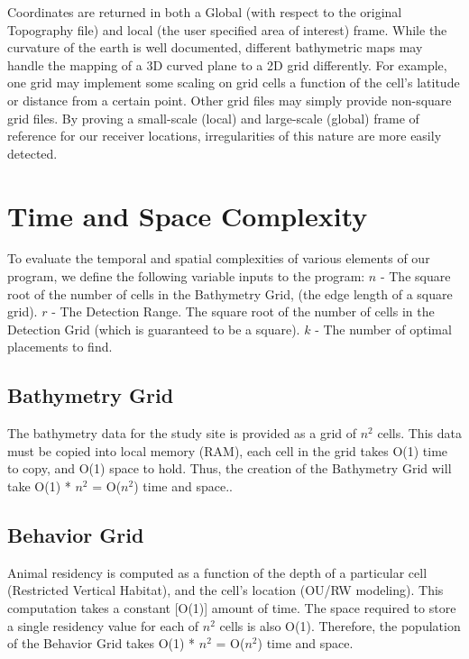 Coordinates are returned in both a Global (with respect to the original Topography file) and local (the user specified area of interest) frame.  While the curvature of the earth is well documented, different bathymetric maps may handle the mapping of a 3D curved plane to a 2D grid differently.  For example, one grid may implement some scaling on grid cells a function of the cell's latitude or distance from a certain point.  Other grid files may simply provide non-square grid files.  By proving a small-scale (local) and large-scale (global) frame of reference for our receiver locations, irregularities of this nature are more easily detected.


\section{Time and Space Complexity}
\label{computationalComplexity}
To evaluate the temporal and spatial complexities of various elements of our program, we define the following variable inputs to the program:\newline
$n$ - The square root of the number of cells in the Bathymetry Grid, (the edge length of a square grid).\newline
$r$ - The Detection Range.  The square root of the number of cells in the Detection Grid (which is guaranteed to be a square).\newline
$k$ - The number of optimal placements to find.\newline

\subsection{Bathymetry Grid}
The bathymetry data for the study site is provided as a grid of $n^2$ cells.  This data must be copied into local memory (RAM), each cell in the grid takes O(1) time to copy, and O(1) space to hold.  Thus, the creation of the Bathymetry Grid will take O(1) * $n^2$ = O($n^2$) time and space..

\subsection{Behavior Grid}
Animal residency is computed as a function of the depth of a particular cell (Restricted Vertical Habitat), and the cell's location (OU/RW modeling).  This computation takes a constant [O(1)] amount of time.  The space required to store a single residency value for each of $n^2$ cells is also O(1).  Therefore, the population of the Behavior Grid takes O(1) * $n^2$ = O($n^2$) time and space.


